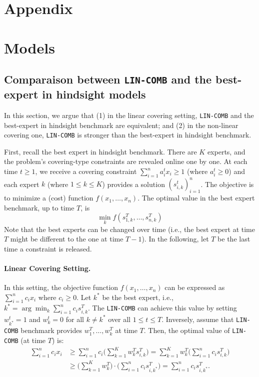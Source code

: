 
\section*{Appendix}

\section{Models}


\subsection{Comparaison between \texttt{LIN-COMB} and the best-expert in hindsight models}
In this section, we argue that (1) in the linear covering setting, \texttt{LIN-COMB} and the best-expert in hindsight benchmark are equivalent;
and (2) in the non-linear covering one,  \texttt{LIN-COMB} is stronger than the best-expert in hindsight benchmark. 

First, recall the best expert in hindsight benchmark. There are $K$ experts, and the problem's covering-type constraints are revealed online one by one.
At each time $t \geq 1$, we receive a covering constraint $\sum_{i=1}^{n} a_{i}^{t} x_{i} \geq 1$ (where $a_{i}^{t} \geq 0$) and each expert $k$ (where $1 \leq k \leq K$) provides
a solution $(s_{i,k}^{t})_{i=1}^{n}$. The objective is to minimize a (cost) function $f(x_{1}, \ldots, x_{n})$. The optimal value in the best expert benchmark, up to time $T$, is 
$$
\min_{k} f(s_{1,k}^{T}, \ldots, s_{n,k}^{T})
$$
%
Note that the best experts can be changed over time (i.e., the best expert at time $T$ might be different to the one at time $T-1$).
In the following, let $T$ be the last time a constraint is released. 

\paragraph{Linear Covering Setting.} In this setting, the objective function $f(x_{1}, \ldots, x_{n})$ can be expressed as $\sum_{i=1}^{n} c_{i} x_{i}$ where $c_{i} \geq 0$.
Let $k^{*}$ be the best expert, i.e., $k^{*} = \arg \min_{k} \sum_{i=1}^{n} c_{i} s_{i,k}^{T}$. The \texttt{LIN-COMB} can achieve this value by setting 
$w_{k^{*}}^{t} = 1$ and $w_{k}^{t} = 0$ for all $k \neq k^{*}$ over all $1 \leq t \leq T$. Inversely, assume that \texttt{LIN-COMB} benchmark provides $w_{1}^{T}, \ldots, w_{k}^{T}$
at time $T$. Then, the optimal value of \texttt{LIN-COMB} (at time $T$) is:
\begin{align*}
\sum_{i=1}^{n} c_{i} x_{i} &\geq \sum_{i=1}^{n} c_{i} \biggl( \sum_{k=1}^{K} w_{k}^{T} s_{i,k}^{T} \biggr)
= \sum_{k=1}^{K} w_{k}^{T}  \biggl( \sum_{i=1}^{n} c_{i} s_{i,k}^{T} \biggr) \\
%
&\geq \biggl ( \sum_{k=1}^{K} w_{k}^{T} \biggr) \cdot \biggl( \sum_{i=1}^{n} c_{i} s_{i,k^{*}}^{T} \biggr)
=  \sum_{i=1}^{n} c_{i} s_{i,k^{*}}^{T}.
\end{align*}

